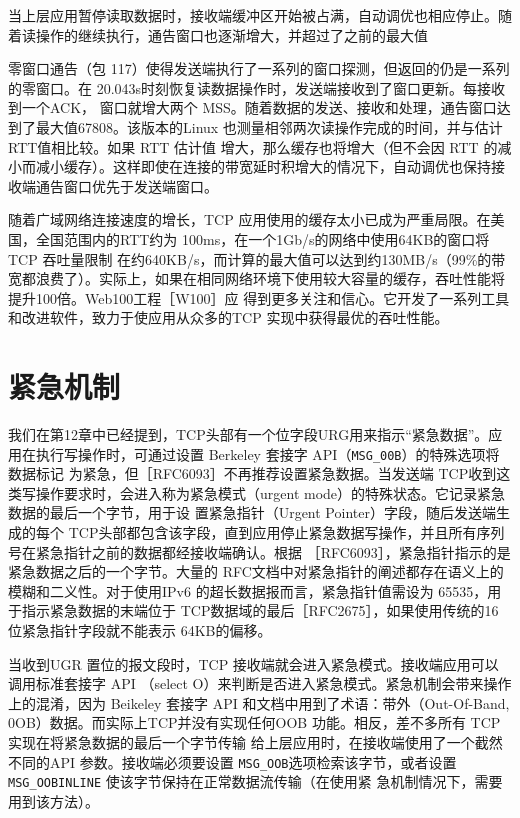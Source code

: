 当上层应用暂停读取数据时，接收端缓冲区开始被占满，自动调优也相应停止。随着读操作的继续执行，通告窗口也逐渐增大，并超过了之前的最大值

零窗口通告（包 117）使得发送端执行了一系列的窗口探测，但返回的仍是一系列的零窗口。在 20.043s时刻恢复读数据操作时，发送端接收到了窗口更新。每接收到一个ACK，
窗口就增大两个 MSS。随着数据的发送、接收和处理，通告窗口达到了最大值67808。该版本的Linux 也测量相邻两次读操作完成的时间，并与估计 RTT值相比较。如果 RTT 估计值
增大，那么缓存也将增大（但不会因 RTT 的减小而减小缓存）。这样即使在连接的带宽延时积增大的情况下，自动调优也保持接收端通告窗口优先于发送端窗口。

随着广域网络连接速度的增长，TCP 应用使用的缓存太小已成为严重局限。在美国，全国范围内的RTT约为 100ms，在一个1Gb/s的网络中使用64KB的窗口将 TCP 吞吐量限制
在约640KB/s，而计算的最大值可以达到约130MB/s（99\%的带宽都浪费了）。实际上，如果在相同网络环境下使用较大容量的缓存，吞吐性能将提升100倍。Web100工程［W100］应
得到更多关注和信心。它开发了一系列工具和改进软件，致力于使应用从众多的TCP 实现中获得最优的吞吐性能。

\section{紧急机制}
我们在第12章中已经提到，TCP头部有一个位字段URG用来指示“紧急数据”。应用在执行写操作时，可通过设置 Berkeley 套接字 API（\verb|MSG_00B|）的特殊选项将数据标记
为紧急，但［RFC6093］不再推荐设置紧急数据。当发送端 TCP收到这类写操作要求时，会进入称为紧急模式（urgent mode）的特殊状态。它记录紧急数据的最后一个字节，用于设
置紧急指针（Urgent Pointer）字段，随后发送端生成的每个 TCP头部都包含该字段，直到应用停止紧急数据写操作，并且所有序列号在紧急指针之前的数据都经接收端确认。根据
［RFC6093］，紧急指针指示的是紧急数据之后的一个字节。大量的 RFC文档中对紧急指针的阐述都存在语义上的模糊和二义性。对于使用IPv6 的超长数据报而言，紧急指针值需设为
65535，用于指示紧急数据的末端位于 TCP数据域的最后［RFC2675］，如果使用传统的16位紧急指针字段就不能表示 64KB的偏移。

当收到UGR 置位的报文段时，TCP 接收端就会进入紧急模式。接收端应用可以调用标准套接字 API （select O）来判断是否进入紧急模式。紧急机制会带来操作上的混淆，因为
Beikeley 套接字 API 和文档中用到了术语：带外（Out-Of-Band, 0OB）数据。而实际上TCP并没有实现任何OOB 功能。相反，差不多所有 TCP实现在将紧急数据的最后一个字节传输
给上层应用时，在接收端使用了一个截然不同的API 参数。接收端必须要设置 \verb|MSG_OOB|选项检索该字节，或者设置 \verb|MSG_OOBINLINE| 使该字节保持在正常数据流传输（在使用紧
急机制情况下，需要用到该方法）。

